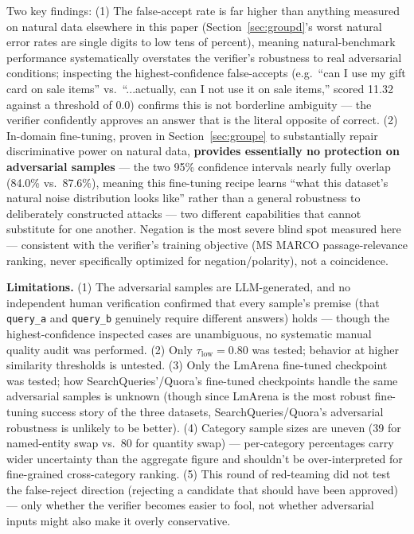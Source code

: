 \documentclass[11pt]{article}
\newcommand{\taulow}{\ensuremath{\tau_{\text{low}}}}
\begin{document}
Two key findings: (1) The false-accept rate is far higher than anything measured on natural data elsewhere in this paper (Section~\ref{sec:groupd}'s worst natural error rates are single digits to low tens of percent), meaning natural-benchmark performance systematically overstates the verifier's robustness to real adversarial conditions; inspecting the highest-confidence false-accepts (e.g.\ ``can I use my gift card on sale items'' vs.\ ``...actually, can I not use it on sale items,'' scored 11.32 against a threshold of 0.0) confirms this is not borderline ambiguity --- the verifier confidently approves an answer that is the literal opposite of correct. (2) In-domain fine-tuning, proven in Section~\ref{sec:groupe} to substantially repair discriminative power on natural data, \textbf{provides essentially no protection on adversarial samples} --- the two 95\% confidence intervals nearly fully overlap (84.0\% vs.\ 87.6\%), meaning this fine-tuning recipe learns ``what this dataset's natural noise distribution looks like'' rather than a general robustness to deliberately constructed attacks --- two different capabilities that cannot substitute for one another. Negation is the most severe blind spot measured here --- consistent with the verifier's training objective (MS MARCO passage-relevance ranking, never specifically optimized for negation/polarity), not a coincidence.

\textbf{Limitations.} (1) The adversarial samples are LLM-generated, and no independent human verification confirmed that every sample's premise (that \texttt{query\_\allowbreak{}a} and \texttt{query\_\allowbreak{}b} genuinely require different answers) holds --- though the highest-confidence inspected cases are unambiguous, no systematic manual quality audit was performed. (2) Only $\taulow=0.80$ was tested; behavior at higher similarity thresholds is untested. (3) Only the LmArena fine-tuned checkpoint was tested; how SearchQueries'/Quora's fine-tuned checkpoints handle the same adversarial samples is unknown (though since LmArena is the most robust fine-tuning success story of the three datasets, SearchQueries/Quora's adversarial robustness is unlikely to be better). (4) Category sample sizes are uneven (39 for named-entity swap vs.\ 80 for quantity swap) --- per-category percentages carry wider uncertainty than the aggregate figure and shouldn't be over-interpreted for fine-grained cross-category ranking. (5) This round of red-teaming did not test the false-reject direction (rejecting a candidate that should have been approved) --- only whether the verifier becomes easier to fool, not whether adversarial inputs might also make it overly conservative.
\end{document}
